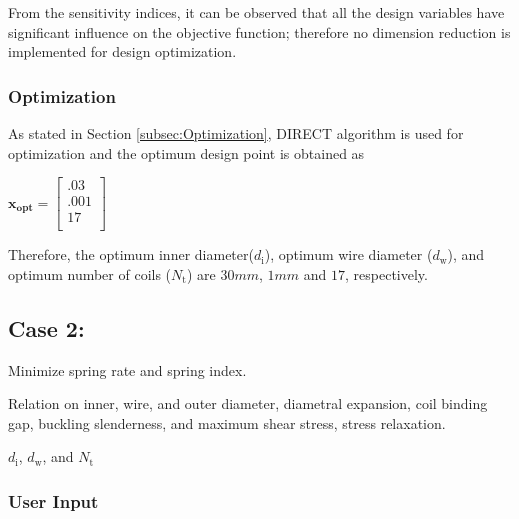 \documentclass[10pt]{article}
\begin{document}
From the sensitivity indices, it can be observed that all the design variables have significant influence on the objective function; therefore no dimension reduction is implemented for design optimization. 

	\subsubsection{Optimization}
	
	As stated in Section \ref{subsec:Optimization}, DIRECT algorithm is used for optimization and the optimum design point is obtained as 
	\begin{center}
	$\mathbf{x_{opt}} =
	\left[
	\begin{array}{c}
	 	 .03 \\
	 	 .001 \\
		 17    \\ 
		
	 \end{array}
	 \right]
$	
\end{center}
    Therefore, the optimum inner diameter($d_{\text{i}}$), optimum wire diameter ($d_{\text{w}}$), and optimum number of coils ($N_{\text{t}}$) are $30 mm$, $1 mm$ and $17$, respectively.
		
\newpage

\subsection{Case 2:}
\label{subsec:Case2}
\vspace{-.1in}
\begin{description}[leftmargin=!,labelwidth=\widthof{\bfseries Design Variables:}, labelindent = 1cm]
	\item[Objectives:] Minimize spring rate and spring index.\\
	\item[Constraints:] Relation on inner, wire, and outer diameter, diametral expansion, coil binding gap, buckling slenderness, and maximum shear stress, stress relaxation. \\
	\item[Design Variables:] $d_{\text{i}}$, $d_{\text{w}}$, and $N_{\text{t}}$ \\
\end{description}

	\subsubsection{User Input}
	
\end{document}
